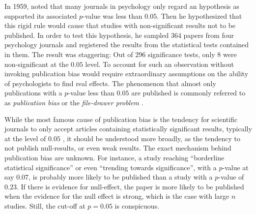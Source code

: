 In 1959, \citeauthor{Sterling1959-cq} noted that many journals in psychology only regard an hypothesis as supported its associated $p$-value was less than $0.05$. Then he hypothesized that this rigid rule would cause that studies with non-significant results not to be published. In order to test this hypothesis, he sampled $364$ papers from four psychology journals and registered the results from the statistical tests contained in them. The result was staggering: Out of $296$ significance tests, only $8$ were non-significant at the $0.05$ level. To account for such an observation without invoking publication bias would require extraordinary assumptions on the ability of psychologists to find real effects. The phenomenon that almost only publications with a $p$-value less than $0.05$ are published is commonly referred to as \emph{publication bias} or the \emph{file-drawer
problem} \parencite{rosenthal_file_1979}.

While the most famous cause of publication bias is the tendency for scientific journals to only accept articles containing statistically significant results, typically at the level of $0.05$ \parencite{simmons_false-positive_2011}, it should be understood more broadly, as the tendency to not publish null-results, or even weak results. The exact mechanism behind publication bias are unknown. For instance, a study reaching ``borderline statistical significance'' or even ``trending towards significance'', with a $p$-value at say $0.07$, is probably more likely to be published than a study with a $p$-value of $0.23$. If there is evidence for null-effect, the paper is more likely to be published when the evidence for the null effect is strong, which is the case with large $n$ studies. Still, the cut-off at $p = 0.05$ is conspicuous. 

